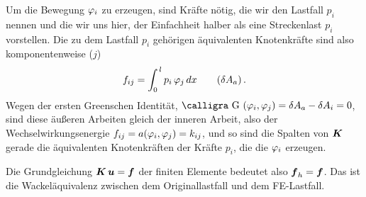 {Um die Bewegung $\varphi_i$ zu erzeugen, sind Kr\"{a}fte n\"{o}tig, die wir den Lastfall $p_i$ nennen und die wir uns hier, der Einfachheit halber als eine Streckenlast $p_i$ vorstellen. Die zu dem Lastfall $p_i$ geh\"{o}rigen \"{a}quivalenten Knotenkr\"{a}fte sind also komponentenweise ($j$)
\begin{align}
f_{ij}    = \int_0^{\,l} p_i\,\varphi_j\,dx \qquad (\delta A_a)\,.
\end{align}
Wegen der ersten Greenschen Identit\"{a}t, $\text{\normalfont\calligra G\,\,}(\Np_i,\Np_j) = \delta A_a - \delta A_i = 0$, sind diese \"{a}u{\ss}eren Arbeiten gleich der inneren Arbeit, also der Wechselwirkungsenergie $f_{ij} = a(\varphi_i,\varphi_j) = k_{ij}$, und so sind die Spalten von $\mbox{\boldmath $K$}$ gerade die \"{a}quivalenten Knotenkr\"{a}ften der Kr\"{a}fte $p_i$, die die $\varphi_i$ erzeugen.

Die Grundgleichung $\mbox{\boldmath $K$}\,\mbox{\boldmath $u$} = \mbox{\boldmath $f$}$ der finiten Elemente bedeutet also $\mbox{\boldmath $f$}_h = \mbox{\boldmath $f$}$.  Das ist die \glq Wackel\"{a}quivalenz\grq{} zwischen dem Originallastfall und dem FE-Lastfall.

}
